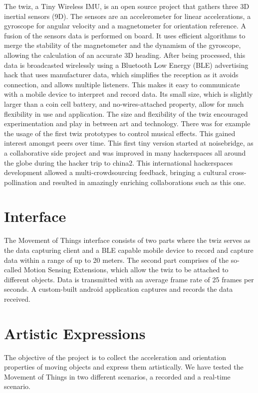 \documentclass{sigchi}
\begin{document}
The twiz, a Tiny Wireless IMU, is an open source project
that gathers three 3D inertial sensors (9D). The
sensors are an accelerometer for linear accelerations,
a gyroscope for angular velocity and a magnetometer for
orientation reference. A fusion of the sensors data is
performed on board. It uses efficient algorithms to
merge the stability of the magnetometer and the
dynamism of the gyroscope, allowing the calculation of
an accurate 3D heading. After being processed, this
data is broadcasted wirelessly using a Bluetooth Low
Energy (BLE) advertising hack that uses manufacturer
data, which simplifies the reception as it avoids
connection, and allows multiple listeners. This makes it
easy to communicate with a mobile device to interpret
and record data. Its small size, which is slightly larger
than a coin cell battery, and no-wires-attached
property, allow for much flexibility in use and
application.
The size and flexibility of the twiz encouraged
experimentation and play in between art and
technology. There was for example the usage of the
first twiz prototypes to control musical effects. This
gained interest amongst peers over time. This first tiny
version started at noisebridge, as a collaborative side
project and was improved in many hackerspaces all
around the globe during the hacker trip to china2.
This international hackerspaces development allowed a
multi-crowdsourcing feedback, bringing a cultural
cross-pollination and resulted in amazingly enriching
collaborations such as this one.

\section{Interface}

The Movement of Things interface consists of two parts
where the twiz serves as the data capturing client and a
BLE capable mobile device to record and capture data
within a range of up to 20 meters. The second part
comprises of the so-called Motion Sensing Extensions,
which allow the twiz to be attached to different objects.
Data is transmitted with an average frame rate of 25
frames per seconds. A custom-built android application
captures and records the data received.

\section{Artistic Expressions}

The objective of the project is to collect the acceleration
and orientation properties of moving objects and
express them artistically. We have tested the
Movement of Things in two different scenarios, a
recorded and a real-time scenario.
\end{document}
